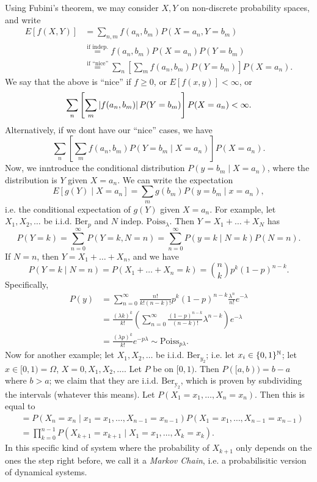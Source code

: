 \medskip\newline
\noindent Using Fubini's theorem, we may consider $X, Y$ on non-discrete probability spaces, and write
\begin{align*}
    E[f(X, Y)] &= \sum_{n, m} f(a_n, b_m) P(X = a_n, Y = b_m) \\
    &\stackrel{\text{if indep.}}{=} f(a_n, b_m) P(X = a_n) P(Y = b_m) \\
    &\stackrel{\text{if ``nice''}}{=} \sum_n \left[ \sum_m f(a_n, b_m) P(Y = b_m) \right] P(X = a_n).
\end{align*}
We say that the above is ``nice'' if $f \geq 0$, or $E[f(x, y)] < \infty$, or
\[ \sum_n \left[ \sum_m \left\lvert f(a_n, b_m) \right\rvert P(Y = b_m) \right] P(X = a_n) < \infty. \]
Alternatively, if we dont have our ``nice'' cases, we have
\[ \sum_n \left[ \sum_m f(a_n, b_m) P(Y = b_m \mid X = a_n) \right] P(X = a_n). \]
\medskip\newline
Now, we inntroduce the conditional distribution $P(y = b_m \mid X = a_n)$, where the distribution is $Y$ given $X = a_n$. We can write the expectation
\[ E[g(Y) \mid X = a_n] = \sum_m g(b_m) P(y = b_m \mid x = a_n), \]
i.e. the conditional expectation of $g(Y)$ given $X = a_n$. For example, let $X_1, X_2, \dots$ be i.i.d. $\mathrm{Ber}_p$ and $N$ indep. $\mathrm{Poiss}_\lambda$. Then $Y = X_1 + \dots + X_N$ has
\[ P(Y = k) = \sum_{n = 0}^\infty P(Y = k, N = n) = \sum_{n = 0}^\infty P(y = k \mid N = k) P(N = n). \]
If $N = n$, then $Y = X_1 + \dots + X_n$, and we have
\[ P(Y = k \mid N = n) = P(X_1 + \dots + X_n = k) = \binom{n}{k} p^k (1-p)^{n-k}. \] 
Specifically,
\begin{align*}
    P(y) &= \sum_{n=0}^\infty \frac{n!}{k!(n-k)!} p^k (1-p)^{n-k} \frac{\lambda^n}{n!} e^{-\lambda} \\
    &= \frac{(\lambda k)^k}{k!} \left( \sum_{n=0}^\infty \frac{(1-p)^{n-k}}{(n-k)!} \lambda^{n-k} \right) e^{-\lambda} \\
    &= \frac{(\lambda p)^k}{k!} e^{-p \lambda} \sim \mathrm{Poiss}_{p \lambda}.
\end{align*}
\medskip\newline
\noindent Now for another example; let $X_1, X_2, \dots$ be i.i.d. $\mathrm{Ber}_{y_2}$; i.e. let $x_i \in \{0, 1\}^\mathbb N$; let $x \in [0, 1) = \Omega$, $X = 0, X_1, X_2, \dots$. Let $P$ be on $[0, 1)$. Then $P([a, b)) = b - a$ where $b > a$; we claim that they are i.i.d. $\mathrm{Ber_{y_2}}$, which is proven by subdividing the intervals (whatever this means).
\medskip\newline
\noindent Let $P(X_1 = x_1, \dots, X_n = x_n)$. Then this is equal to
\begin{align*}
    &= P(X_n = x_n \mid x_1 = x_1, \dots, X_{n-1} = x_{n-1}) P(X_1 = x_1, \dots, X_{n-1} = x_{n-1}) \\
    &= \prod_{k=0}^{n-1} P(X_{k+1} = x_{k+1} \mid X_1 = x_1, \dots, X_k = x_k).
\end{align*}
In this specific kind of system where the probability of $X_{k+1}$ only depends on the ones the step right before, we call it a \textit{Markov Chain}, i.e. a probabilisitic version of dynamical systems.